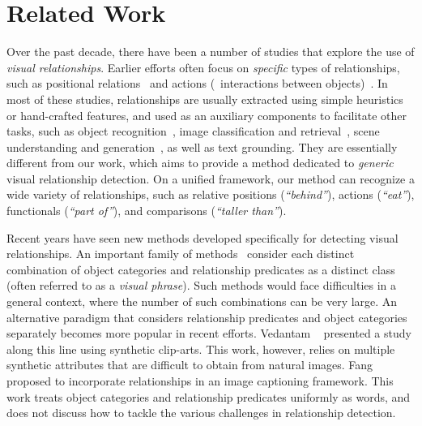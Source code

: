 \documentclass[10pt,twocolumn,letterpaper]{article}
\begin{document}
\section{Related Work}\label{sec:relwork}%

Over the past decade, there have been a number of studies that explore
the use of \emph{visual relationships}.
%
Earlier efforts often focus on \emph{specific} types of relationships, 
such as positional relations~\cite{gupta2008beyond, johnson2015image, galleguillos2008object, choi2013understanding, kulkarni2011baby, elliott2013image}
and actions (\ie~interactions between objects)~\cite{yao2010grouplet, gkioxari2015contextual, regneri2013grounding, thomason2014integrating, ramanathan2015learning, rohrbach2013translating, guadarrama2013youtube2text, antol2014zero, elhoseiny2015sherlock, farhadi2010every,xiong2015recognize}.
%
In most of these studies, relationships are usually extracted using simple 
heuristics or hand-crafted features, and used as 
an auxiliary components to facilitate other tasks, such as
object recognition~\cite{galleguillos2010context, sivic2005discovering, kumar2010efficiently, choi2010exploiting, ladicky2010graph, salakhutdinov2011learning, rabinovich2007objects, fidler2007towards, russell2006using},
image classification and retrieval~\cite{mensink2014costa, gong2014multi},
scene understanding and generation~\cite{zitnick2013learning, hoiem2008putting, chang2014semantic, yao2012describing, izadinia2014incorporating, gould2008multi, berg2012understanding},
as well as text grounding\cite{plummer2015flickr30k, karpathy2014deep, rohrbach2015grounding}.
%
They are essentially different from our work, which aims to provide a method
dedicated to \emph{generic} visual relationship detection.
On a unified framework, our method can recognize a wide variety of relationships, 
such as relative positions (\emph{``behind''}), actions (\emph{``eat''}), 
functionals (\emph{``part of''}), and comparisons (\emph{``taller than''}).

Recent years have seen new methods developed specifically for detecting visual relationships. 
An important family of methods~\cite{das2013thousand, divvala2014learning, sadeghi2011recognition}
consider each distinct combination of object categories and relationship predicates as
a distinct class (often referred to as a \emph{visual phrase}). 
Such methods would face difficulties in a general context, 
where the number of such combinations can be very large. 
%
An alternative paradigm that considers relationship predicates and object categories separately
becomes more popular in recent efforts. 
Vedantam \etal~\cite{vedantam2015learning} presented a study along this line
using synthetic clip-arts. This work, however, relies on multiple synthetic attributes
that are difficult to obtain from natural images. 
Fang \etal~\cite{fang2015captions} proposed to incorporate relationships in an image captioning
framework.
This work treats object categories and relationship predicates uniformly as words,
and does not discuss how to tackle the various challenges in relationship detection. 
\end{document}
